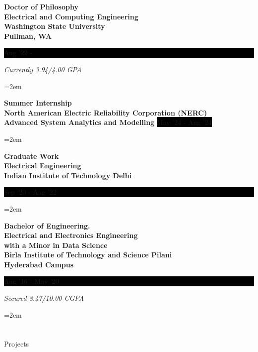 \documentclass[paper=a4,fontsize=11pt]{scrartcl} %
\newcommand{\sepspace}{\vspace*{1em}}		%
\newcommand{\NewPart}[1]{\section*{\uppercase{#1}}}
\newcommand{\EducationEntry}[4]{
		\noindent \textbf{#1} \hfill      %
		\colorbox{Black}{%
			\parbox{10em}{%
			\hfill\color{White}#2}} \par  %
		\noindent \textit{#3} \par        %
		\noindent\hangindent=2em\hangafter=0 \small #4 %
		\normalsize \par}
\newcommand{\WorkEntry}[4]{				  %
		\noindent \textbf{#1} \hfill      %
		\colorbox{Black}{\color{White}#2} \par  %
		\noindent \textit{#3} \par              %
		\noindent\hangindent=2em\hangafter=0 \small #4 %
		\normalsize \par}
\begin{document}
\EducationEntry{Doctor of Philosophy\\ Electrical and Computing Engineering \\ Washington State University \\ Pullman, WA}{Aug '22 -}{Currently 3.94/4.00 GPA}{}
\sepspace
\WorkEntry{Summer Internship \\ North American Electric Reliability Corporation (NERC) \\ Advanced System Analytics and Modelling}{May '24 - Aug '24}{}{}
\sepspace
\EducationEntry{Graduate Work \\ Electrical Engineering \\ Indian Institute of Technology Delhi}{Sep '20 - Aug '22}{}{}
\sepspace
\EducationEntry{Bachelor of Engineering. \\ Electrical and Electronics Engineering\\
with a Minor in Data Science \\
Birla Institute of Technology and Science Pilani\\ Hyderabad Campus}{Aug '16 - May '20}{Secured 8.47/10.00 CGPA}



\NewPart{Projects}{}
\end{document}
